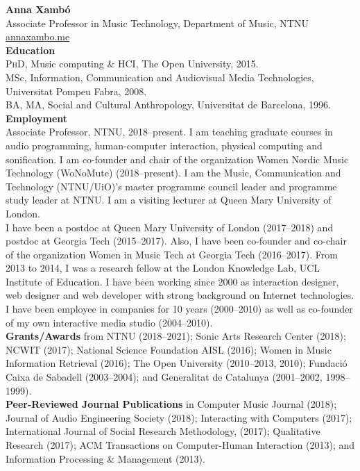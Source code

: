 \documentclass[10pt, a4paper]{article}
\begin{document}

{\textbf{Anna Xambó}}\\
Associate Professor in Music Technology, Department of Music, NTNU\\
\href{http://annaxambo.me/}{annaxambo.me}\\ 

{\textbf{Education}}\\
\textsc{PhD}, Music computing \& HCI, The Open University, 2015.\\
MSc, Information, Communication and Audiovisual Media Technologies, Universitat Pompeu Fabra, 2008.\\
BA, MA, Social and Cultural Anthropology, Universitat de Barcelona, 1996.\\

{\textbf{Employment}}\\
Associate Professor, NTNU, 2018--present. I am teaching graduate courses in audio programming, human-computer interaction, physical computing and sonification. I am co-founder and chair of the organization Women Nordic Music Technology (WoNoMute) (2018--present). I am the Music, Communication and Technology (NTNU/UiO)'s master programme council leader and programme study leader at NTNU. I am a visiting lecturer at Queen Mary University of London.\\
I have been a postdoc at Queen Mary University of London (2017--2018) and postdoc at Georgia Tech (2015--2017). Also, I have been co-founder and co-chair of the organization Women in Music Tech at Georgia Tech (2016--2017). From 2013 to 2014, I was a research fellow at the London Knowledge Lab, UCL Institute of Education.
I have been working since 2000 as interaction designer, web designer and web developer with strong background on Internet technologies. I have been employee in companies for 10 years (2000--2010) as well as co-founder of my own interactive media studio (2004--2010).\\

{\textbf{Grants/Awards}} from NTNU (2018--2021); Sonic Arts Research Center (2018); NCWIT (2017); National Science Foundation AISL (2016); Women in Music Information Retrieval (2016); The Open University (2010--2013, 2010); Fundació Caixa de Sabadell (2003--2004); and Generalitat de Catalunya (2001--2002, 1998--1999).\\

{\textbf{Peer-Reviewed Journal Publications}} in Computer Music Journal (2018); Journal of Audio Engineering Society (2018); Interacting with Computers (2017); International Journal of Social Research Methodology, (2017); Qualitative Research (2017); ACM Transactions on Computer-Human Interaction (2013); and Information Processing \& Management (2013).\\
\end{document}
